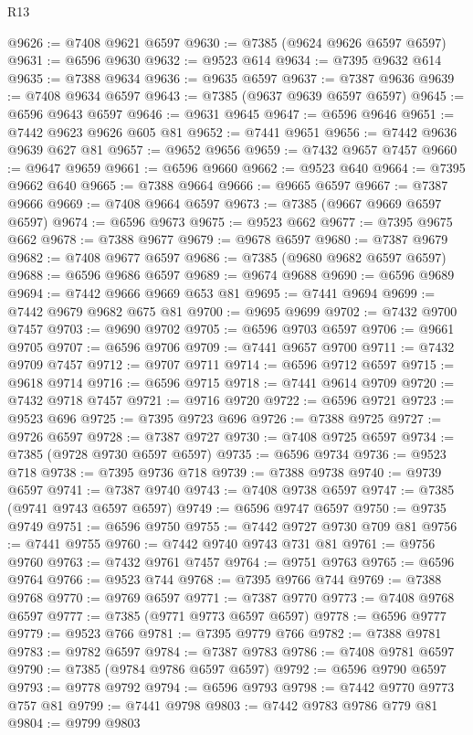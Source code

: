 \begin{lexlean}{R13}
\begin{coremodule}
@9626 := @7408 @9621 @6597
@9630 := @7385 (@9624 @9626 @6597 @6597)
@9631 := @6596 @9630
@9632 := @9523 @614
@9634 := @7395 @9632 @614
@9635 := @7388 @9634
@9636 := @9635 @6597
@9637 := @7387 @9636
@9639 := @7408 @9634 @6597
@9643 := @7385 (@9637 @9639 @6597 @6597)
@9645 := @6596 @9643 @6597
@9646 := @9631 @9645
@9647 := @6596 @9646
@9651 := @7442 @9623 @9626 @605 @81
@9652 := @7441 @9651
@9656 := @7442 @9636 @9639 @627 @81
@9657 := @9652 @9656
@9659 := @7432 @9657 @7457
@9660 := @9647 @9659
@9661 := @6596 @9660
@9662 := @9523 @640
@9664 := @7395 @9662 @640
@9665 := @7388 @9664
@9666 := @9665 @6597
@9667 := @7387 @9666
@9669 := @7408 @9664 @6597
@9673 := @7385 (@9667 @9669 @6597 @6597)
@9674 := @6596 @9673
@9675 := @9523 @662
@9677 := @7395 @9675 @662
@9678 := @7388 @9677
@9679 := @9678 @6597
@9680 := @7387 @9679
@9682 := @7408 @9677 @6597
@9686 := @7385 (@9680 @9682 @6597 @6597)
@9688 := @6596 @9686 @6597
@9689 := @9674 @9688
@9690 := @6596 @9689
@9694 := @7442 @9666 @9669 @653 @81
@9695 := @7441 @9694
@9699 := @7442 @9679 @9682 @675 @81
@9700 := @9695 @9699
@9702 := @7432 @9700 @7457
@9703 := @9690 @9702
@9705 := @6596 @9703 @6597
@9706 := @9661 @9705
@9707 := @6596 @9706
@9709 := @7441 @9657 @9700
@9711 := @7432 @9709 @7457
@9712 := @9707 @9711
@9714 := @6596 @9712 @6597
@9715 := @9618 @9714
@9716 := @6596 @9715
@9718 := @7441 @9614 @9709
@9720 := @7432 @9718 @7457
@9721 := @9716 @9720
@9722 := @6596 @9721
@9723 := @9523 @696
@9725 := @7395 @9723 @696
@9726 := @7388 @9725
@9727 := @9726 @6597
@9728 := @7387 @9727
@9730 := @7408 @9725 @6597
@9734 := @7385 (@9728 @9730 @6597 @6597)
@9735 := @6596 @9734
@9736 := @9523 @718
@9738 := @7395 @9736 @718
@9739 := @7388 @9738
@9740 := @9739 @6597
@9741 := @7387 @9740
@9743 := @7408 @9738 @6597
@9747 := @7385 (@9741 @9743 @6597 @6597)
@9749 := @6596 @9747 @6597
@9750 := @9735 @9749
@9751 := @6596 @9750
@9755 := @7442 @9727 @9730 @709 @81
@9756 := @7441 @9755
@9760 := @7442 @9740 @9743 @731 @81
@9761 := @9756 @9760
@9763 := @7432 @9761 @7457
@9764 := @9751 @9763
@9765 := @6596 @9764
@9766 := @9523 @744
@9768 := @7395 @9766 @744
@9769 := @7388 @9768
@9770 := @9769 @6597
@9771 := @7387 @9770
@9773 := @7408 @9768 @6597
@9777 := @7385 (@9771 @9773 @6597 @6597)
@9778 := @6596 @9777
@9779 := @9523 @766
@9781 := @7395 @9779 @766
@9782 := @7388 @9781
@9783 := @9782 @6597
@9784 := @7387 @9783
@9786 := @7408 @9781 @6597
@9790 := @7385 (@9784 @9786 @6597 @6597)
@9792 := @6596 @9790 @6597
@9793 := @9778 @9792
@9794 := @6596 @9793
@9798 := @7442 @9770 @9773 @757 @81
@9799 := @7441 @9798
@9803 := @7442 @9783 @9786 @779 @81
@9804 := @9799 @9803

\end{coremodule}
\end{lexlean}
